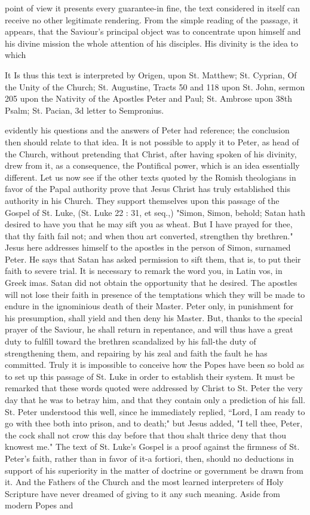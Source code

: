 point of view it presents every guarantee-in fine, the text considered in itself can receive no other legitimate rendering. From the simple reading of the passage, it appears, that the Saviour's principal object was to concentrate upon himself and his divine mission the whole attention of his disciples. His divinity is the idea to which

It Is thus this text is interpreted by Origen, upon St. Matthew; St. Cyprian, Of the Unity of the Church; St. Augustine, Tracts 50 and 118 upon St. John, sermon 205 upon the Nativity of the Apostles Peter and Paul; St. Ambrose upon 38th Psalm; St. Pacian, 3d letter to Sempronius.

evidently his questions and the answers of Peter had reference; the conclusion then should relate to that idea. It is not possible to apply it to Peter, as head of the Church, without pretending that Christ, after having spoken of his divinity, drew from it, as a consequence, the Pontifical power, which is an idea essentially different. Let us now see if the other texts quoted by the Romish theologians in favor of the Papal authority prove that Jesus Christ has truly established this authority in his Church. They support themselves upon this passage of the Gospel of St. Luke, (St. Luke 22 : 31, et seq.,) "Simon, Simon, behold; Satan hath desired to have you that he may sift you as wheat. But I have prayed for thee, that thy faith fail not; and when thou art converted, strengthen thy brethren." Jesus here addresses himself to the apostles in the person of Simon, surnamed Peter. He says that Satan has asked permission to sift them, that is, to put their faith to severe trial. It is necessary to remark the word you, in Latin vos, in Greek imas. Satan did not obtain the opportunity that he desired. The apostles will not lose their faith in presence of the temptations which they will be made to endure in the ignominious death of their Master. Peter only, in punishment for his presumption, shall yield and then deny his Master. But, thanks to the special prayer of the Saviour, he shall return in repentance, and will thus have a great duty to fulfill toward the brethren scandalized by his fall-the duty of strengthening them, and repairing by his zeal and faith the fault he has committed. Truly it is impossible to conceive how the Popes have been so bold as to set up this passage of St. Luke in order to establish their system. It must be remarked that these words quoted were addressed by Christ to St. Peter the very day that he was to betray him, and that they contain only a prediction of his fall. St. Peter understood this well, since he immediately replied, “Lord, I am ready to go with thee both into prison, and to death;" but Jesus added, "I tell thee, Peter, the cock shall not crow this day before that thou shalt thrice deny that thou knowest me." The text of St. Luke's Gospel is a proof against the firmness of St. Peter's faith, rather than in favor of it-a fortiori, then, should no deductions in support of his superiority in the matter of doctrine or government be drawn from it. And the Fathers of the Church and the most learned interpreters of Holy Scripture have never dreamed of giving to it any such meaning. Aside from modern Popes and 
